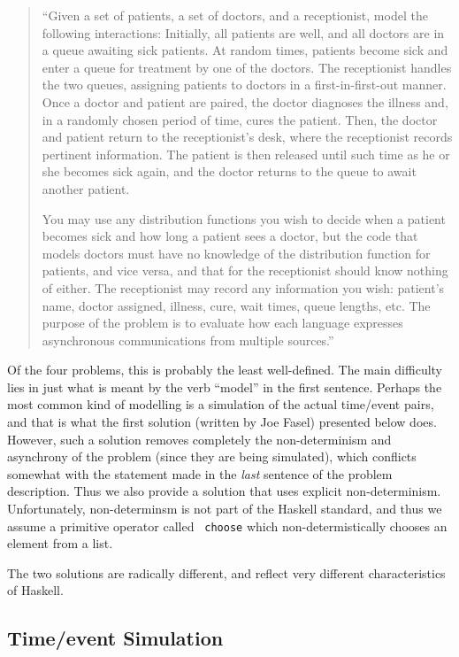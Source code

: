 \begin{quotation}
``Given a set of patients, a set of doctors, and a receptionist, model
the following interactions: Initially, all patients are well, and all
doctors are in a queue awaiting sick patients.  At random times,
patients become sick and enter a queue for treatment by one of the
doctors.  The receptionist handles the two queues, assigning patients
to doctors in a first-in-first-out manner.  Once a doctor and patient
are paired, the doctor diagnoses the illness and, in a randomly chosen
period of time, cures the patient.  Then, the doctor and patient
return to the receptionist's desk, where the receptionist records
pertinent information.  The patient is then released until such time
as he or she becomes sick again, and the doctor returns to the queue
to await another patient.

You may use any distribution functions you wish to decide when a patient
becomes  sick  and  how  long a patient sees a doctor, but the code that
models doctors must have no knowledge of the distribution  function  for
patients,  and  vice  versa,  and  that for the receptionist should know
nothing of either.  The receptionist  may  record  any  information  you
wish:  patient's name, doctor assigned, illness, cure, wait times, queue
lengths, etc.  The purpose of  the  problem  is  to  evaluate  how  each
language expresses asynchronous communications from multiple sources.''
\end{quotation}

Of the four problems, this is probably the least well-defined.  The
main difficulty lies in just what is meant by the verb ``model'' in
the first sentence.  Perhaps the most common kind of modelling is a
simulation of the actual time/event pairs, and that is what the first
solution (written by Joe Fasel) presented below does.  However, such a
solution removes completely the non-determinism and asynchrony of the
problem (since they are being simulated), which conflicts somewhat
with the statement made in the {\em last}\/ sentence of the problem
description.  Thus we also provide a solution that uses explicit
non-determinism.  Unfortunately, non-determinsm is not part of the
Haskell standard, and thus we assume a primitive operator called {\tt
choose} which non-determistically chooses an element from a list.

The two solutions are radically different, and reflect very different
characteristics of Haskell.

\subsection{Time/event Simulation}

